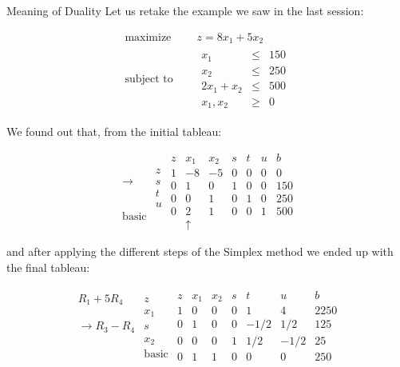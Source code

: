 \documentclass[c]{beamer}
\begin{document}
\begin{frame}[allowframebreaks]{Meaning of Duality}
  Let us retake the example we saw in the last session:

  \begin{equation*}
    \begin{aligned}
      \text{maximize } \quad & z = 8x_1+5x_2 \\
      \text{subject to }\quad &
      \begin{array}{rcl}
        x_1 &\leq &150 \\
        x_2 &\leq &250 \\
        2x_1+x_2 &\leq &500 \\
        x_1,x_2 &\geq& 0
      \end{array}
    \end{aligned}
  \end{equation*}

  We found out that, from the initial tableau:

\begin{equation*}
\begin{array}{cc}
&\\
&z \\
\rightarrow &s \\
&t \\
&u\\
\mathrm{basic}
\end{array}
%
\begin{array}{c|ccccc|c}
  z & x_1 & x_2 & s & t & u & b \\ \hline
  1 & -8 & -5 & 0 & 0 & 0 & 0 \\ \hline
  0 & 1 & 0 & 1 & 0 & 0 & 150  \\
  0 & 0 & 1 & 0 & 1 & 0 & 250 \\
  0 & 2 & 1 & 0 & 0 & 1 & 500 \\
    & \uparrow & & & & &
\end{array}
\end{equation*}

and after applying the different steps of the Simplex method we ended up with the final tableau:

  \begin{equation*}
  \begin{array}{cc}
  &\\
  R_1+5R_4&z \\
  &x_1 \\
  \rightarrow R_3-R_4&s \\
  &x_2\\
  &\mathrm{basic} \\
  \end{array}
  \begin{array}{c|ccccc|c}
    z & x_1 & x_2 & s & t & u & b \\ \hline
    1 & 0 & 0 & 0 & 1 & 4 & 2250 \\ \hline
    0 & 1 & 0 & 0 & -1/2 & 1/2 & 125  \\
    0 & 0 & 0 & 1 & 1/2 & -1/2 & 25 \\
    0 & 1 & 1 & 0 & 0 & 0 & 250 
  \end{array}
  \end{equation*}


\end{frame}
\end{document}
